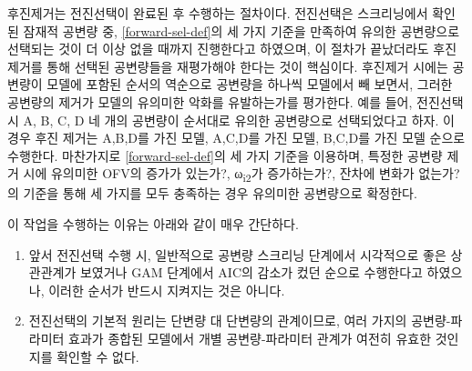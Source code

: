 \documentclass[
  11pt,
  krantz2, a4paper, twoside]{krantz}
\providecommand{\tightlist}{%
  \setlength{\itemsep}{0pt}\setlength{\parskip}{0pt}}
\theoremstyle{definition}
\theoremstyle{definition}
\theoremstyle{definition}
\theoremstyle{remark}
\begin{document}

후진제거는 전진선택이 완료된 후 수행하는 절차이다. 전진선택은 스크리닝에서 확인된 잠재적 공변량 중, \ref{forward-sel-def}의 세 가지 기준을 만족하여 유의한 공변량으로 선택되는 것이 더 이상 없을 때까지 진행한다고 하였으며, 이 절차가 끝났더라도 후진제거를 통해 선택된 공변량들을 재평가해야 한다는 것이 핵심이다. 후진제거 시에는 공변량이 모델에 포함된 순서의 역순으로 공변량을 하나씩 모델에서 빼 보면서, 그러한 공변량의 제거가 모델의 유의미한 악화를 유발하는가를 평가한다. 예를 들어, 전진선택 시 A, B, C, D 네 개의 공변량이 순서대로 유의한 공변량으로 선택되었다고 하자. 이 경우 후진 제거는 A,B,D를 가진 모델, A,C,D를 가진 모델, B,C,D를 가진 모델 순으로 수행한다. 마찬가지로 \ref{forward-sel-def}의 세 가지 기준을 이용하며, 특정한 공변량 제거 시에 유의미한 OFV의 증가가 있는가?, ω\textsubscript{i2}가 증가하는가?, 잔차에 변화가 없는가?의 기준을 통해 세 가지를 모두 충족하는 경우 유의미한 공변량으로 확정한다.

이 작업을 수행하는 이유는 아래와 같이 매우 간단하다.

\begin{enumerate}
\def\labelenumi{\arabic{enumi}.}
\tightlist
\item
  앞서 전진선택 수행 시, 일반적으로 공변량 스크리닝 단계에서 시각적으로 좋은 상관관계가 보였거나 GAM 단계에서 AIC의 감소가 컸던 순으로 수행한다고 하였으나, 이러한 순서가 반드시 지켜지는 것은 아니다.
\item
  전진선택의 기본적 원리는 단변량 대 단변량의 관계이므로, 여러 가지의 공변량-파라미터 효과가 종합된 모델에서 개별 공변량-파라미터 관계가 여전히 유효한 것인지를 확인할 수 없다.
\end{enumerate}
\end{document}
